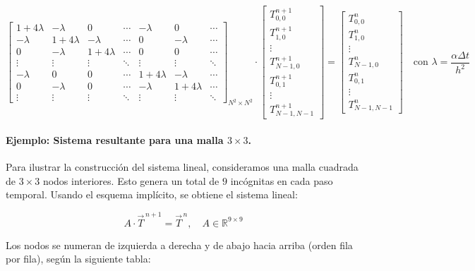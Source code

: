 \documentclass{article}
\begin{document}
$$
\begin{bmatrix}
1+4\lambda & -\lambda & 0 & \cdots & -\lambda & 0 & \cdots \\
-\lambda & 1+4\lambda & -\lambda & \cdots & 0 & -\lambda & \cdots \\
0 & -\lambda & 1+4\lambda & \cdots & 0 & 0 & \cdots \\
\vdots & \vdots & \vdots & \ddots & \vdots & \vdots & \ddots \\
-\lambda & 0 & 0 & \cdots & 1+4\lambda & -\lambda & \cdots \\
0 & -\lambda & 0 & \cdots & -\lambda & 1+4\lambda & \cdots \\
\vdots & \vdots & \vdots & \ddots & \vdots & \vdots & \ddots
\end{bmatrix}_{N^2 \times N^2}
\cdot
\begin{bmatrix}
T_{0,0}^{n+1} \\
T_{1,0}^{n+1} \\
\vdots \\
T_{N-1,0}^{n+1} \\
T_{0,1}^{n+1} \\
\vdots \\
T_{N-1,N-1}^{n+1}
\end{bmatrix}
=
\begin{bmatrix}
T_{0,0}^{n} \\
T_{1,0}^{n} \\
\vdots \\
T_{N-1,0}^{n} \\
T_{0,1}^{n} \\
\vdots \\
T_{N-1,N-1}^{n}
\end{bmatrix}
\quad \text{con } \lambda = \frac{\alpha \Delta t}{h^2}
$$

\paragraph{Ejemplo: Sistema resultante para una malla $3 \times 3$.} Para ilustrar la construcción del sistema lineal, consideramos una malla cuadrada de $3 \times 3$ nodos interiores. Esto genera un total de $9$ incógnitas en cada paso temporal. Usando el esquema implícito, se obtiene el sistema lineal:

$$
A \cdot \vec{T}^{\,n+1} = \vec{T}^{\,n}, \quad A \in \mathbb{R}^{9 \times 9}
$$

Los nodos se numeran de izquierda a derecha y de abajo hacia arriba (orden fila por fila), según la siguiente tabla:
\end{document}
